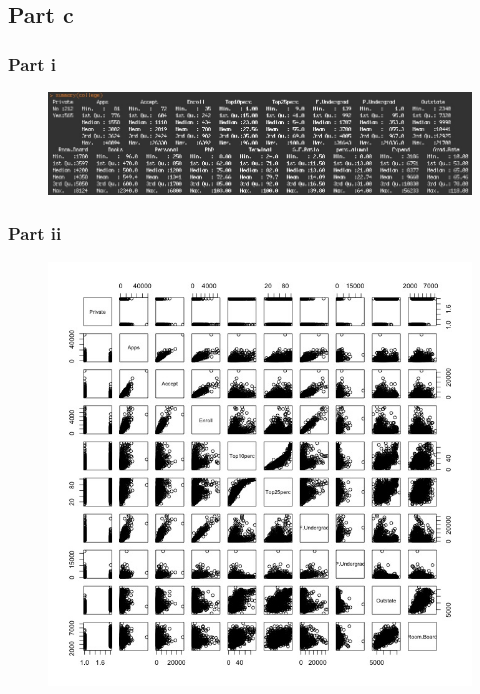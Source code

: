 \documentclass[11pt]{article}
\begin{document}
\subsection*{Part c}

\subsubsection*{Part i}

\begin{figure}[H]
	\centering
	\includegraphics[width=6.5in]{8ci.jpeg}
\end{figure}

\subsubsection*{Part ii}

\begin{figure}[H]
	\centering
	\includegraphics[width=5.5in]{8cii.jpeg}
\end{figure}
\end{document}
